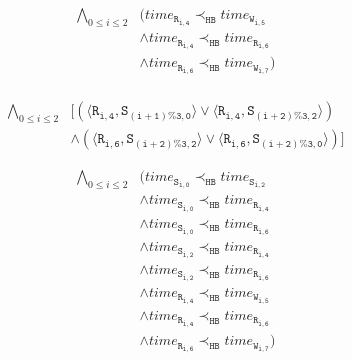 \newsavebox{\boxPOInfinite}
\begin{lrbox}{\boxPOInfinite}
\begin{minipage}[t]{0.55\linewidth}
\large
\begin{align*}
\bigwedge_{0 \leq i \leq 2} & (\mathit{time}_\mathtt{R_{i,4}} \prec_\mathtt{HB} \mathit{time}_\mathtt{W_{i,5}}\\
                                     & \wedge \mathit{time}_\mathtt{R_{i,4}} \prec_\mathtt{HB} \mathit{time}_\mathtt{R_{i,6}}\\
                                     & \wedge \mathit{time}_\mathtt{R_{i,6}} \prec_\mathtt{HB} \mathit{time}_\mathtt{W_{i,7}})\\
\end{align*}
\end{minipage}
\end{lrbox}

\newsavebox{\boxMPInfinite}
\begin{lrbox}{\boxMPInfinite}
\begin{minipage}[t]{0.55\linewidth}
\large
\begin{align*}
\bigwedge_{0 \leq i \leq 2} & [(\langle\mathtt{R_{i,4}},\mathtt{S_{(i+1)\%3,0}}\rangle \vee\langle\mathtt{R_{i,4}},\mathtt{S_{(i+2) \% 3,2}}\rangle)\\
                                          & \wedge(\langle\mathtt{R_{i,6}},\mathtt{S_{(i+2)\%3,2}}\rangle \vee \langle\mathtt{R_{i,6}},\mathtt{S_{(i+2)\%3,0}}\rangle)]
\end{align*}
\end{minipage}
\end{lrbox}

\newsavebox{\boxPOZero}
\begin{lrbox}{\boxPOZero}
\begin{minipage}[t]{0.55\linewidth}
\large
\begin{align*}
\bigwedge_{0 \leq i \leq 2} & (\mathit{time}_\mathtt{S_{i,0}}\prec_\mathtt{HB} \mathit{time}_\mathtt{S_{i,2}}\\
				   & \wedge \mathit{time}_\mathtt{S_{i,0}} \prec_\mathtt{HB} \mathit{time}_\mathtt{R_{i,4}}\\
				   & \wedge \mathit{time}_\mathtt{S_{i,0}} \prec_\mathtt{HB} \mathit{time}_\mathtt{R_{i,6}}\\
				   & \wedge \mathit{time}_\mathtt{S_{i,2}} \prec_\mathtt{HB} \mathit{time}_\mathtt{R_{i,4}}\\
				   & \wedge \mathit{time}_\mathtt{S_{i,2}} \prec_\mathtt{HB} \mathit{time}_\mathtt{R_{i,6}}\\
				   & \wedge \mathit{time}_\mathtt{R_{i,4}} \prec_\mathtt{HB} \mathit{time}_\mathtt{W_{i,5}}\\
                                     & \wedge \mathit{time}_\mathtt{R_{i,4}} \prec_\mathtt{HB} \mathit{time}_\mathtt{R_{i,6}}\\
                                     & \wedge \mathit{time}_\mathtt{R_{i,6}} \prec_\mathtt{HB} \mathit{time}_\mathtt{W_{i,7}})
\end{align*}
\end{minipage}
\end{lrbox}

